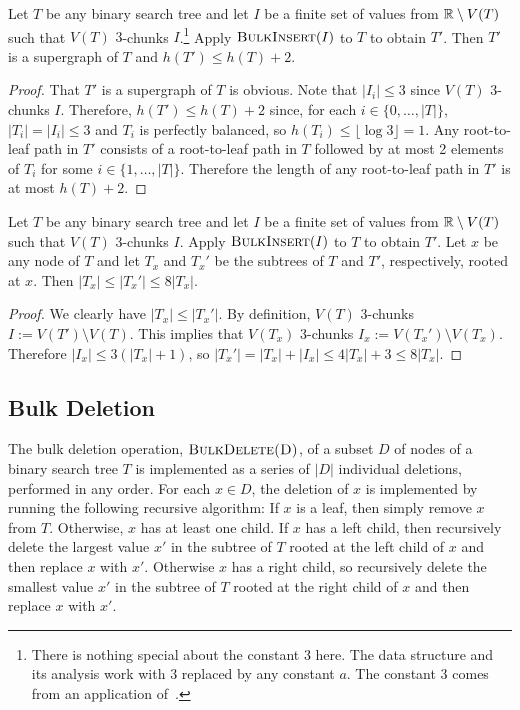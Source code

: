 \documentclass[kpfonts]{patmorin}
\let\le\leqslant
\begin{document}
\begin{lem}
  Let $T$ be any binary search tree and let $I$ be a finite set of values from $\mathbb{R}\setminus V(T)$ such that
  $V(T)$ $3$-chunks $I$.\footnote{There is nothing special about the constant $3$ here.  The data structure and its analysis work with $3$ replaced by any constant $a$. The constant $3$ comes from an application of~.}
  Apply $\textsc{BulkInsert}(I)$ to $T$ to obtain $T'$.
  Then $T'$ is a supergraph of $T$ and $h(T')\le h(T)+2$.
\end{lem}

\begin{proof}
  That $T'$ is a supergraph of $T$ is obvious.  Note that $|I_i|\le 3$ since $V(T)$ $3$-chunks $I$.  Therefore, $h(T')\le h(T)+2$ since, for each $i\in\{0,\ldots,|T|\}$, $|T_i|=|I_i|\le 3$ and $T_i$ is perfectly balanced, so $h(T_i)\le\lfloor\log 3\rfloor = 1$.  Any root-to-leaf path in $T'$ consists of a root-to-leaf path in $T$ followed by at most 2 elements of $T_i$ for some $i\in\{1,\ldots,|T|\}$.  Therefore the length of any root-to-leaf path in $T'$ is at most $h(T)+2$.
\end{proof}

\begin{lem}
  Let $T$ be any binary search tree and let $I$ be a finite set of values from $\mathbb{R}\setminus V(T)$ such that
  $V(T)$ $3$-chunks $I$.
  Apply $\textsc{BulkInsert}(I)$ to $T$ to obtain $T'$.
  Let $x$ be any node of $T$ and let $T_x$ and $T_x'$ be the subtrees of $T$ and $T'$, respectively, rooted at $x$.
  Then $|T_x|\le |T_x'|\le 8|T_x|$.
\end{lem}

\begin{proof}
We clearly have  $|T_x|\le |T_x'|$.  By definition, $V(T)$ 3-chunks $I:=V(T')\setminus V(T)$.  This implies that $V(T_x)$ 3-chunks $I_x:=V(T_x')\setminus V(T_x)$.  Therefore $|I_x|\le 3(|T_x|+1)$, so $|T_x'|=|T_x|+|I_x|\le 4|T_x|+3 \le 8|T_x|$.
\end{proof}


\subsection{Bulk Deletion}

The bulk deletion operation, $\textsc{BulkDelete(D)}$, of a subset $D$ of nodes of a binary search tree $T$ is implemented as a series of $|D|$ individual deletions, performed in any order. For each $x\in D$, the deletion of $x$ is implemented by running the following recursive algorithm:  If $x$ is a leaf, then simply remove $x$ from $T$.  Otherwise, $x$ has at least one child.  If $x$ has a left child, then recursively delete the largest value $x'$ in the subtree of $T$ rooted at the left child of $x$ and then replace $x$ with $x'$.  Otherwise $x$ has a right child, so recursively delete the smallest value $x'$ in the subtree of $T$ rooted at the right child of $x$ and then replace $x$ with $x'$.
\end{document}
